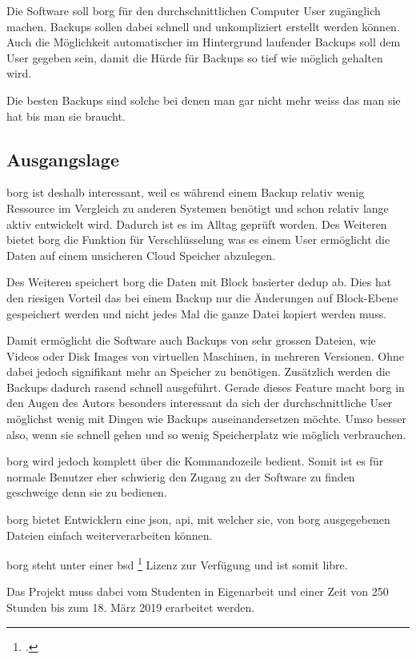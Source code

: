 Die Software soll \gls{borg} für den durchschnittlichen Computer User zugänglich
machen. Backups sollen dabei schnell und unkompliziert erstellt werden können.
Auch die Möglichkeit automatischer im Hintergrund laufender Backups soll dem
User gegeben sein, damit die Hürde für Backups so tief wie möglich gehalten
wird.

Die besten Backups sind solche bei denen man gar nicht mehr weiss das man sie
hat bis man sie braucht.

\subsection{Ausgangslage}
\label{sec:org7711a96}

\gls{borg} ist deshalb interessant, weil es während einem Backup relativ
wenig Ressource im Vergleich zu anderen Systemen benötigt und schon relativ
lange aktiv entwickelt wird. Dadurch ist es im Alltag geprüft worden.
Des Weiteren bietet \gls{borg} die Funktion für Verschlüsselung was es einem User
ermöglicht die Daten auf einem unsicheren Cloud Speicher abzulegen.

Des Weiteren speichert \gls{borg} die Daten mit Block basierter \gls{dedup} ab. Dies
hat den riesigen Vorteil das bei einem Backup nur die Änderungen auf
Block-Ebene gespeichert werden und nicht jedes Mal die ganze Datei kopiert
werden muss.

Damit ermöglicht die Software auch Backups von sehr grossen Dateien, wie Videos
oder Disk Images von virtuellen Maschinen, in mehreren Versionen. Ohne dabei
jedoch signifikant mehr an Speicher zu benötigen. Zusätzlich werden die Backups
dadurch rasend schnell ausgeführt. Gerade dieses Feature macht \gls{borg} in den
Augen des Autors besonders interessant da sich der durchschnittliche User
möglichst wenig mit Dingen wie Backups auseinandersetzen möchte. Umso besser
also, wenn sie schnell gehen und so wenig Speicherplatz wie möglich verbrauchen.

\gls{borg} wird jedoch komplett über die Kommandozeile bedient. Somit ist es für
normale Benutzer eher schwierig den Zugang zu der Software zu finden geschweige
denn sie zu bedienen.

\gls{borg} bietet Entwicklern eine \gls{json}, \gls{api}, mit welcher sie, von \gls{borg}
ausgegebenen Dateien einfach weiterverarbeiten können.

\gls{borg} steht unter einer \gls{bsd} \footcite{bsd} Lizenz zur Verfügung und ist somit
\gls{libre}.

Das Projekt muss dabei vom Studenten in Eigenarbeit und einer Zeit von 250
Stunden bis zum 18. März 2019 erarbeitet werden.

